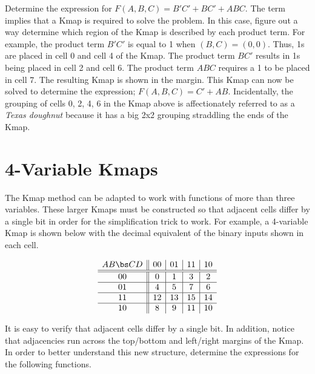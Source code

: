 \begin{process:minimizationKmap}
Determine the \SOPmin expression for $F(A,B,C) = B'C' + BC' + ABC$.  The
\label{page:SymbToSymb} term \SOPmin implies that a Kmap is 
required to solve the problem. In this case, figure out a way 
determine which region of the Kmap is described by each product term.  
For example, the product term $B'C'$ is equal to 1 when $(B,C) = (0,0)$.
Thus, 1s are placed in cell 0 and cell 4 of the Kmap. The product term $BC'$
results in 1s being placed in cell 2 and cell 6.  The product term $ABC$
requires a 1 to be placed in cell 7.  The resulting Kmap is shown in the 
margin.
This Kmap can now be solved to determine the \SOPmin expression;
$F(A,B,C) = C'+AB$.  Incidentally, the grouping of cells 0, 2, 4, 6
in the Kmap above is affectionately referred to as a 
 {\it Texas doughnut} because it has a big 2x2 
grouping straddling the ends of the Kmap.


\section{4-Variable Kmaps}
The Kmap method can be adapted to work with functions of more than three
variables.  These larger Kmaps must be constructed so that adjacent 
cells differ by a single bit in order for the simplification trick 
to work.  For example, a 4-variable Kmap is shown below with the 
decimal equivalent of the binary inputs shown in each cell.

$$ \begin{array} {c||c|c|c|c}
	AB \bs CD & 00 & 01 & 11 & 10 \\ \hline \hline
	00        & 0  & 1  & 3  & 2  \\ \hline
	01        & 4  & 5  & 7  & 6  \\ \hline
	11        & 12 & 13 & 15 & 14 \\ \hline
	10        & 8  & 9  & 11 & 10 \\ 
\end{array} $$

It is easy to verify that adjacent cells differ by a single bit.
In addition, notice that adjacencies run across the top/bottom 
and left/right margins of the Kmap.  In order to better 
understand this new structure, determine the \SOPmin
expressions for the following functions. 


\end{process:minimizationKmap}
